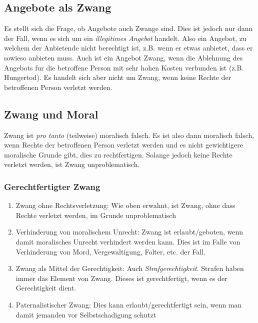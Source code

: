 \documentclass[../main.tex]{subfiles}
\begin{document}
\subsection{Angebote als Zwang}
Es stellt sich die Frage, ob Angebote auch Zwange sind. Dies ist jedoch nur dann der Fall, wenn es sich um ein \textit{illegitimes Angebot} handelt. Also ein Angebot, zu welchem der Anbietende nicht berechtigt ist, z.B. wenn er etwas anbietet, dass er sowieso anbieten muss. Auch ist ein Angebot Zwang, wenn die Ablehnung des Angebots fur die betroffene Person mit sehr hohen Kosten verbunden ist (z.B. Hungertod). Es handelt sich aber nicht um Zwang, wenn keine Rechte der betroffenen Person verletzt werden. 

 \subsection{Zwang und Moral}
 Zwang ist \textit{pro tanto} (teilweise) moralisch falsch. Es ist also dann moralisch falsch, wenn Rechte der betroffenen Person verletzt werden und es nicht gewichtigere moralische Grunde gibt, dies zu rechtfertigen. Solange jedoch keine Rechte verletzt werden, ist Zwang unproblematisch. 
 
 \subsubsection{Gerechtfertigter Zwang}
 \begin{enumerate}
 	\item Zwang ohne Rechtsverletzung: Wie oben erwahnt, ist Zwang, ohne dass Rechte verletzt werden, im Grunde unproblematisch
 	\item Verhinderung von moralischem Unrecht: Zwang ist erlaubt/geboten, wenn damit moralisches Unrecht verhindert werden kann. Dies ist im Falle von Verhinderung von Mord, Vergewaltigung, Folter, etc. der Fall.
 	\item Zwang als Mittel der Gerechtigkeit: Auch \textit{Strafgerechtigkeit}. Strafen haben immer das Element von Zwang. Dieses ist gerechtfertigt, wenn es der Gerechtigkeit dient.
 	\item Paternalistischer Zwang: Dies kann erlaubt/gerechtfertigt sein, wenn man damit jemanden vor Selbstschadigung schutzt
 \end{enumerate}
\end{document}
